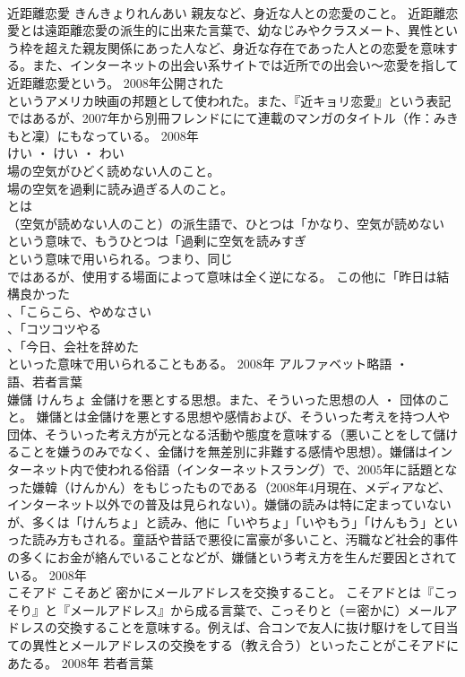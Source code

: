 \documentclass[8pt]{extreport}
\begin{document}
\begin{CJK}{UTF8}{min}
\\	近距離恋愛	きんきょりれんあい	親友など、身近な人との恋愛のこと。	近距離恋愛とは遠距離恋愛の派生的に出来た言葉で、幼なじみやクラスメート、異性という枠を超えた親友関係にあった人など、身近な存在であった人との恋愛を意味する。また、インターネットの出会い系サイトでは近所での出会い～恋愛を指して近距離恋愛という。 2008年公開された
\\	というアメリカ映画の邦題として使われた。また、『近キョリ恋愛』という表記ではあるが、2007年から別冊フレンドににて連載のマンガのタイトル（作：みきもと凜）にもなっている。	2008年	
\\	けい ・ けい ・ わい	
\\	場の空気がひどく読めない人のこと。 
\\	場の空気を過剰に読み過ぎる人のこと。	
\\	とは
\\	（空気が読めない人のこと）の派生語で、ひとつは「かなり、空気が読めない
\\	という意味で、もうひとつは「過剰に空気を読みすぎ
\\	という意味で用いられる。つまり、同じ
\\	ではあるが、使用する場面によって意味は全く逆になる。 この他に「昨日は結構良かった
\\	、「こらこら、やめなさい
\\	、「コツコツやる
\\	、「今日、会社を辞めた
\\	といった意味で用いられることもある。	2008年	アルファベット略語 ・ 
\\	語、若者言葉	
\\	嫌儲	けんちょ	金儲けを悪とする思想。また、そういった思想の人 ・ 団体のこと。	嫌儲とは金儲けを悪とする思想や感情および、そういった考えを持つ人や団体、そういった考え方が元となる活動や態度を意味する（悪いことをして儲けることを嫌うのみでなく、金儲けを無差別に非難する感情や思想）。嫌儲はインターネット内で使われる俗語（インターネットスラング）で、2005年に話題となった嫌韓（けんかん）をもじったものである（2008年4月現在、メディアなど、インターネット以外での普及は見られない）。嫌儲の読みは特に定まっていないが、多くは「けんちょ」と読み、他に「いやちょ」「いやもう」「けんもう」といった読み方もされる。童話や昔話で悪役に富豪が多いこと、汚職など社会的事件の多くにお金が絡んでいることなどが、嫌儲という考え方を生んだ要因とされている。	2008年	
\\	こそアド	こそあど	密かにメールアドレスを交換すること。	こそアドとは『こっそり』と『メールアドレス』から成る言葉で、こっそりと（＝密かに）メールアドレスの交換することを意味する。例えば、合コンで友人に抜け駆けをして目当ての異性とメールアドレスの交換をする（教え合う）といったことがこそアドにあたる。	2008年	若者言葉	

\end{CJK}
\end{document}
